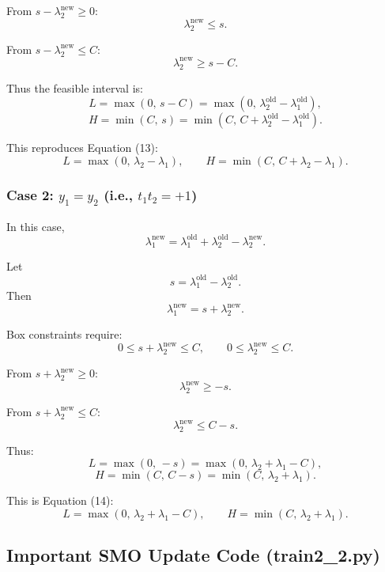 \documentclass[12pt]{article}
\begin{document}
From $s - \lambda_2^{\text{new}} \ge 0$:
\[
\lambda_2^{\text{new}} \le s.
\]

From $s - \lambda_2^{\text{new}} \le C$:
\[
\lambda_2^{\text{new}} \ge s - C.
\]

Thus the feasible interval is:
\[
L = \max(0,\, s - C) = \max(0,\, \lambda_2^{\text{old}} - \lambda_1^{\text{old}}),
\]
\[
H = \min(C,\, s) = \min(C,\, C + \lambda_2^{\text{old}} - \lambda_1^{\text{old}}).
\]

This reproduces Equation (13):
\[
\boxed{
L = \max(0,\, \lambda_2 - \lambda_1), \qquad
H = \min(C,\, C + \lambda_2 - \lambda_1)
}.
\]

\subsubsection*{Case 2: $y_1 = y_2$ (i.e., $t_1 t_2 = +1$)}

In this case,
\[
\lambda_1^{\text{new}}
=
\lambda_1^{\text{old}}
+
\lambda_2^{\text{old}}
-
\lambda_2^{\text{new}}.
\]

Let
\[
s = \lambda_1^{\text{old}} - \lambda_2^{\text{old}}.
\]
Then
\[
\lambda_1^{\text{new}}
=
s + \lambda_2^{\text{new}}.
\]

Box constraints require:
\[
0 \le s + \lambda_2^{\text{new}} \le C,
\qquad
0 \le \lambda_2^{\text{new}} \le C.
\]

From $s + \lambda_2^{\text{new}} \ge 0$:
\[
\lambda_2^{\text{new}} \ge -s.
\]

From $s + \lambda_2^{\text{new}} \le C$:
\[
\lambda_2^{\text{new}} \le C - s.
\]

Thus:
\[
L = \max(0,\, -s) = \max(0,\, \lambda_2 + \lambda_1 - C),
\]
\[
H = \min(C,\, C - s) = \min(C,\, \lambda_2 + \lambda_1).
\]

This is Equation (14):
\[
\boxed{
L = \max(0,\, \lambda_2 + \lambda_1 - C), \qquad
H = \min(C,\, \lambda_2 + \lambda_1)
}.
\]
\subsection*{Important SMO Update Code (train2\_2.py)}
\end{document}
